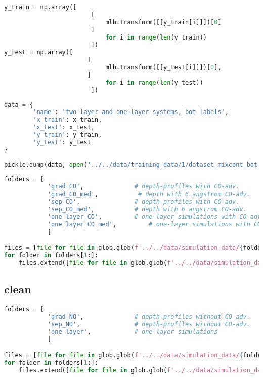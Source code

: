 \begin{lstlisting}[language=Python]
y_train = np.array([    
                        [
                            mlb.transform([[y_train[i]]])[0]
                        ] 
                            for i in range(len(y_train))
                        ])
y_test = np.array([ 
                       [
                            mlb.transform([[y_test[i]]])[0],
                       ] 
                            for i in range(len(y_test))
                        ])
\end{lstlisting}

\begin{lstlisting}[language=Python]
data = {
        'name': 'two-layer and one-layer systems, bot labels',
        'x_train': x_train,
        'x_test': x_test,
        'y_train': y_train,
        'y_test': y_test
}
\end{lstlisting}

\begin{lstlisting}[language=Python]
pickle.dump(data, open('../../data/training_data/1/dataset_mixcont_bot_layer.pkl', 'wb'))
\end{lstlisting}

\begin{lstlisting}[language=Python]
folders = [
            'grad_CO',              # depth-profiles with CO-adv.       with gradient layers
            'grad_CO_med',           # depth with 6 angstrom CO-adv.       with gradient layers
            'sep_CO',               # depth-profiles with CO-adv.       with separated layers
            'sep_CO_med',           # depth with 6 angstrom CO-adv.       with separated layers
            'one_layer_CO',         # one-layer simulations with CO-adv.
            'one_layer_CO_med',         # one-layer simulations with CO-adv.
            ]

files = [file for file in glob.glob(f'../../data/simulation_data/{folders[0]}/*.spc')]
for folder in folders[1:]:
    files.extend([file for file in glob.glob(f'../../data/simulation_data/{folder}/*.spc')])
\end{lstlisting}

\hypertarget{clean}{%
\subsection*{clean}\label{clean}}

\begin{lstlisting}[language=Python]
folders = [
            'grad_NO',              # depth-profiles without CO-adv.    with gradient layers
            'sep_NO',               # depth-profiles without CO-adv.    with separated layers
            'one_layer',            # one-layer simulations
            ]

files = [file for file in glob.glob(f'../../data/simulation_data/{folders[0]}/*.spc')]
for folder in folders[1:]:
    files.extend([file for file in glob.glob(f'../../data/simulation_data/{folder}/*.spc')])
\end{lstlisting}

